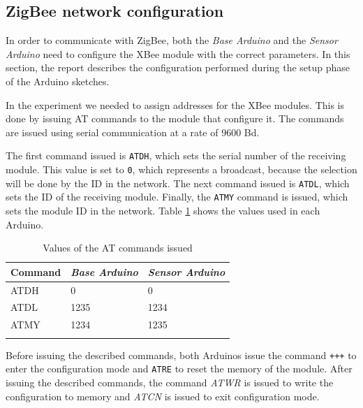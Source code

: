 \documentclass[conference, a4paper]{IEEEtran}
\begin{document}
\subsection{ZigBee network configuration}

In order to communicate with ZigBee, both the \textit{Base Arduino} and the \textit{Sensor Arduino} need to configure the XBee module with the correct parameters. In this section, the report describes the configuration performed during the setup phase of the Arduino sketches.

In the experiment we needed to assign addresses for the XBee modules. This is done by issuing AT commands to the module that configure it. The commands are issued using serial communication at a rate of 9600 Bd.

The first command issued is \texttt{ATDH}, which sets the serial number of the receiving module. This value is set to \texttt{0}, which represents a broadcast, because the selection will be done by the ID in the network. The next command issued is \texttt{ATDL}, which sets the ID of the receiving module. Finally, the \texttt{ATMY} command is issued, which sets the module ID in the network. Table \ref{table_vals} shows the values used in each Arduino.

\begin{table}[h]
\centering
\begin{tabular}{lll}
Command                     & \textit{Base Arduino}    & \textit{Sensor Arduino}  \\ \hline
\rowcolor[HTML]{EFEFEF} 
{\color[HTML]{333333} ATDH} & {\color[HTML]{333333} 0} & {\color[HTML]{333333} 0} \\
ATDL                        & 1235                     & 1234                     \\
\rowcolor[HTML]{EFEFEF} 
ATMY                        & 1234                     & 1235                     \\
                            &                          &
\end{tabular}
\caption{Values of the AT commands issued}
\label{table_vals}
\end{table}

Before issuing the described commands, both Arduinos issue the command \texttt{+++} to enter the configuration mode and \texttt{ATRE} to reset the memory of the module. After issuing the described commands, the command \textit{ATWR} is issued to write the configuration to memory and \textit{ATCN} is issued to exit configuration mode.
\end{document}
